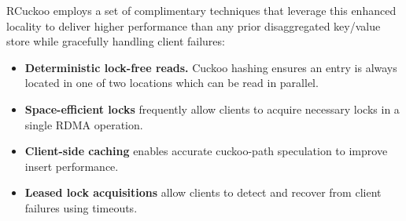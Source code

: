 %
%
RCuckoo employs a set of
complimentary techniques that leverage this enhanced locality to deliver higher performance than any prior
disaggregated key/value store while gracefully handling client
failures:

\begin{itemize}
\item{\textbf{Deterministic lock-free reads.}  Cuckoo hashing ensures
  an entry is always located in one of two locations which can be
  read in parallel.}

\item{\textbf{Space-efficient locks} frequently allow clients to acquire necessary 
  locks in a single RDMA operation.}

\item{\textbf{Client-side caching} enables accurate cuckoo-path
  speculation to improve insert performance.}

\item{\textbf{Leased lock acquisitions} allow clients to detect
  and recover from client failures using timeouts.}
\end{itemize}



